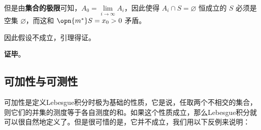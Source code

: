 但是由\textbf{集合的极限}可知，$A_0=\lim\limits_{i\to\infty} A_i$，因此使得 $A_i\cap S=\varnothing$ 恒成立的 $S$ 必须是空集 $\varnothing$，而这和 $\opn{m^*}S=x_0>0$ 矛盾。

因此假设不成立，引理得证。

\textbf{证毕}。






\subsection{可加性与可测性}

可加性是定义Lebesgue积分时极为基础的性质，它是说，任取两个不相交的集合，则它们的并集的测度等于各自测度的和。如果这个性质成立，那么Lebesgue积分就可以很自然地定义了。但是很可惜的是，它并不成立，我们用以下反例来说明：

